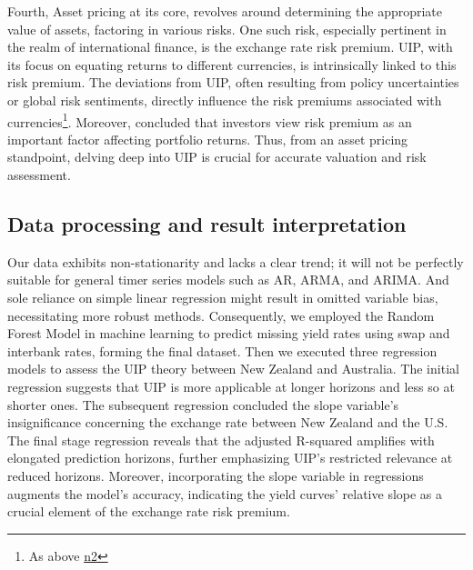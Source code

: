\documentclass[10pt]{article}
\begin{document}
Fourth, Asset pricing at its core, revolves around determining the appropriate value of assets, factoring in various risks. One such risk, especially pertinent in the realm of international finance, is the exchange rate risk premium. UIP, with its focus on equating returns to different currencies, is intrinsically linked to this risk premium. The deviations from UIP, often resulting from policy uncertainties or global risk sentiments, directly influence the risk premiums associated with currencies\footnote{As above \hyperref[kalemli2021five]{n2}}. Moreover, \cite{joseph2021pricing} concluded that investors view risk premium as an important factor affecting portfolio returns. Thus, from an asset pricing standpoint, delving deep into UIP is crucial for accurate valuation and risk assessment.

\subsection{Data processing and result interpretation}
Our data exhibits non-stationarity and lacks a clear trend; it will not be perfectly suitable for general timer series models such as AR, ARMA, and ARIMA. And sole reliance on simple linear regression might result in omitted variable bias, necessitating more robust methods. Consequently, we employed the Random Forest Model in machine learning to predict missing yield rates using swap and interbank rates, forming the final dataset. Then we executed three regression models to assess the UIP theory between New Zealand and Australia. The initial regression suggests that UIP is more applicable at longer horizons and less so at shorter ones. The subsequent regression concluded the slope variable's insignificance concerning the exchange rate between New Zealand and the U.S. The final stage regression reveals that the adjusted R-squared amplifies with elongated prediction horizons, further emphasizing UIP's restricted relevance at reduced horizons. Moreover, incorporating the slope variable in regressions augments the model's accuracy, indicating the yield curves' relative slope as a crucial element of the exchange rate risk premium.
\end{document}
